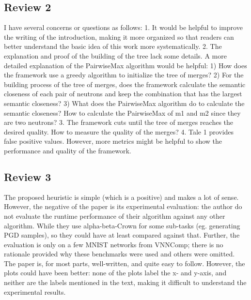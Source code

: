 
  \subsection{Review 2}
  
 I have several concerns or questions as follows:
  1. It would be helpful to improve the writing of the introduction,  making it
     more organized so that readers can better understand the  basic idea of
     this work more systematically. 
  2. The explanation and proof of the building of the tree lack some  details. A
     more detailed explanation of the PairwiseMax algorithm  would be helpful:
 1) How does the framework use a greedy algorithm to initialize the  tree of
    merges?  2) For the building process of the tree of merges, does the
    framework  calculate the semantic closeness of each pair of neutrons and
    keep the  combination that has the largest semantic closeness?
 3) What does the PairwiseMax algorithm do to calculate the semantic  closeness?
    How to calculate the PairwiseMax of m1 and m2 since they  are two neutrons?
  3. The framework cuts until the tree of merges reaches the desired  quality.
     How to measure the quality of the merges?
  4. Tale 1 provides false positive values. However, more metrics might  be
     helpful to show the performance and quality of the framework.

\subsection{Review 3}
     
 The proposed heuristic is simple (which is a positive) and makes a lot  of
 sense. However, the negative of the paper is its experimental  evaluation: the
 author do not evaluate the runtime performance of  their algorithm against any
 other algorithm. While they use  alpha-beta-Crown for some sub-tasks (eg.
 generating PGD samples), so  they could have at least compared against that.
 Further, the  evaluation is only on a few MNIST networks from VNNComp; there is
 no  rationale provided why these benchmarks were used and others were  omitted.
 The paper is, for most parts, well-written, and quite easy to follow.  However,
 the plots could have been better: none of the plots label the  x- and y-axis,
 and neither are the labels mentioned in the text,  making it difficult to
 understand the experimental results. 

